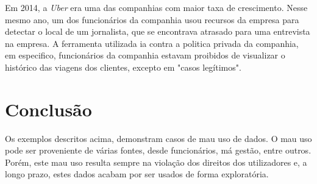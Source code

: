 Em 2014, a \textit{Uber} era uma das companhias com maior taxa de crescimento. Nesse mesmo ano, um dos funcionários da companhia usou recursos da empresa para detectar o local de um jornalista, que se encontrava atrasado para uma entrevista na empresa. A ferramenta utilizada ia contra a politica privada da companhia, em especifico, funcionários da companhia estavam proibidos de visualizar o histórico das viagens dos clientes, excepto em "casos legítimos".


\section{Conclusão}
\label{chap6:conc}

Os exemplos descritos acima, demonstram casos de mau uso de dados. O mau uso pode ser proveniente de várias fontes, desde funcionários, má gestão, entre outros. Porém, este mau uso resulta sempre na violação dos direitos dos utilizadores e, a longo prazo, estes dados acabam por ser usados de forma exploratória.